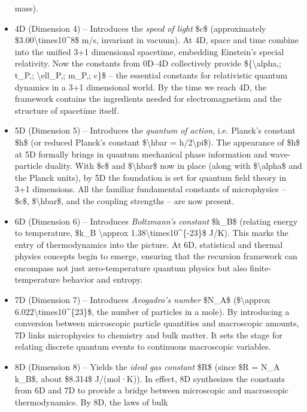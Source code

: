 \documentclass[]{article}
\begin{document}
\begin{itemize}
  mass).
\item
  4D (Dimension 4) -- Introduces the \emph{speed of light} \$c\$
  (approximately \$3.00\textbackslash{}times10\^{}8\$ m/s, invariant in
  vacuum). At 4D, space and time combine into the unified 3+1
  dimensional spacetime, embedding Einstein's special relativity. Now
  the constants from 0D--4D collectively provide
  \$\{\textbackslash{}alpha,; t\_P,; \textbackslash{}ell\_P,; m\_P,;
  c\}\$ -- the essential constants for relativistic quantum dynamics in
  a 3+1 dimensional world. By the time we reach 4D, the framework
  contains the ingredients needed for electromagnetism and the structure
  of spacetime itself.
\item
  5D (Dimension 5) -- Introduces the \emph{quantum of action}, i.e.
  Planck's constant \$h\$ (or reduced Planck's constant
  \$\textbackslash{}hbar = h/2\textbackslash{}pi\$). The appearance of
  \$h\$ at 5D formally brings in quantum mechanical phase information
  and wave-particle duality. With \$c\$ and \$\textbackslash{}hbar\$ now
  in place (along with \$\textbackslash{}alpha\$ and the Planck units),
  by 5D the foundation is set for quantum field theory in 3+1
  dimensions. All the familiar fundamental constants of microphysics --
  \$c\$, \$\textbackslash{}hbar\$, and the coupling strengths -- are now
  present.
\item
  6D (Dimension 6) -- Introduces \emph{Boltzmann's constant} \$k\_B\$
  (relating energy to temperature, \$k\_B \textbackslash{}approx
  1.38\textbackslash{}times10\^{}\{-23\}\$ J/K). This marks the entry of
  thermodynamics into the picture. At 6D, statistical and thermal
  physics concepts begin to emerge, ensuring that the recursion
  framework can encompass not just zero-temperature quantum physics but
  also finite-temperature behavior and entropy.
\item
  7D (Dimension 7) -- Introduces \emph{Avogadro's number} \$N\_A\$
  (\$\textbackslash{}approx 6.022\textbackslash{}times10\^{}\{23\}\$,
  the number of particles in a mole). By introducing a conversion
  between microscopic particle quantities and macroscopic amounts, 7D
  links microphysics to chemistry and bulk matter. It sets the stage for
  relating discrete quantum events to continuous macroscopic variables.
\item
  8D (Dimension 8) -- Yields the \emph{ideal gas constant} \$R\$ (since
  \$R = N\_A k\_B\$, about \$8.314\$ J/(mol·K)). In effect, 8D
  synthesizes the constants from 6D and 7D to provide a bridge between
  microscopic and macroscopic thermodynamics. By 8D, the laws of bulk

\end{itemize}
\end{document}
